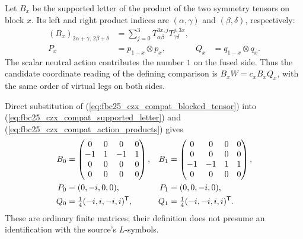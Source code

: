 \documentclass{article}
\begin{document}
Let $B_x$ be the supported letter of the product of the two symmetry tensors on block $x$. Its left and right product indices are $(\alpha,\gamma)$ and $(\beta,\delta)$, respectively:
\begin{align}
    (B_x)_{2\alpha+\gamma,\,2\beta+\delta}
        & =\sum_{j=0}^3 T^{3x,j}_{\alpha\beta}T^{j,3x}_{\gamma\delta},
    \label{eq:fbc25_czx_compat_supported_letter}                                              \\
    P_x & =p_{1-x}\otimes p_x,
        & Q_x                                                          & =q_{1-x}\otimes q_x.
    \label{eq:fbc25_czx_compat_action_products}
\end{align}
The scalar neutral action contributes the number $1$ on the fused side. Thus the candidate coordinate reading of the defining comparison is $B_xW=c_xB_xQ_x$, with the same order of virtual legs on both sides.

Direct substitution of
(\ref{eq:fbc25_czx_compat_blocked_tensor}) into
(\ref{eq:fbc25_czx_compat_supported_letter}) and
(\ref{eq:fbc25_czx_compat_action_products}) gives
\begin{align}
    B_0 & =\begin{pmatrix}0&0&0&0\\-1&1&-1&1\\0&0&0&0\\0&0&0&0\end{pmatrix},
        & B_1                                                                & =\begin{pmatrix}0&0&0&0\\0&0&0&0\\-1&-1&1&1\\0&0&0&0\end{pmatrix},
    \label{eq:fbc25_czx_compat_sparse_letters}                                                                                                                          \\
    P_0 & =(0,-i,0,0),                                                       & P_1                                                                & =(0,0,-i,0), \notag \\
    Q_0 & =\tfrac14(-i,i,-i,i)^{\mathsf T},
        & Q_1                                                                & =\tfrac14(-i,-i,i,i)^{\mathsf T}.
    \label{eq:fbc25_czx_compat_product_columns}
\end{align}
These are ordinary finite matrices; their definition does not presume an identification with the source's $L$-symbols.
\end{document}

